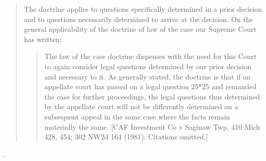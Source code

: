 \documentclass[12pt,\documentclassflag]{michiganCourtOfAppealsBrief}
\begin{document}
\begin{quotation}
 The doctrine applies to questions specifically determined in a prior decision and to questions necessarily determined to arrive at the decision. On the general applicability of the doctrine of law of the case our Supreme Court has written:

\begin{quote}
The law of the case doctrine dispenses with the need for this Court to again consider legal questions determined by our prior decision and necessary to it. As generally stated, the doctrine is that if an appellate court has passed on a legal question 25*25 and remanded the case for further proceedings, the legal questions thus determined by the appellate court will not be differently determined on a subsequent appeal in the same case where the facts remain materially the same. [CAF Investment Co v Saginaw Twp, 410 Mich 428, 454; 302 NW2d 164 (1981). Citations omitted.]
\end{quote}
\end{quotation}

.

\newpage\empty%
\end{document}
